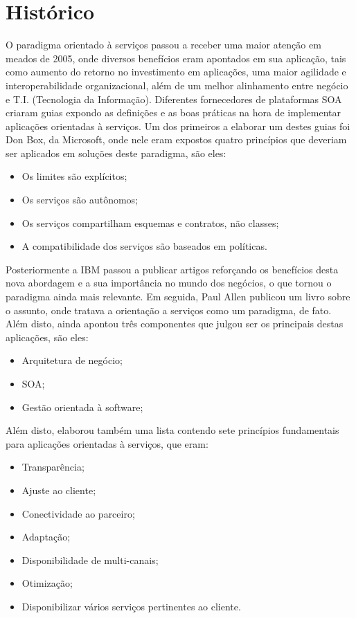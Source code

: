 \documentclass[12pt]{article}
\begin{document}
\section{Histórico}

O paradigma orientado à serviços passou a receber uma maior atenção em meados de 2005, onde diversos benefícios eram apontados em sua aplicação, tais como aumento do retorno no investimento em aplicações, uma maior agilidade e interoperabilidade organizacional, além de um melhor alinhamento entre negócio e T.I. (Tecnologia da Informação).
Diferentes fornecedores de plataformas SOA criaram guias expondo as definições e as boas práticas na hora de implementar aplicações orientadas à serviços. Um dos primeiros a elaborar um destes guias foi Don Box, da Microsoft, onde nele eram expostos quatro princípios que deveriam ser aplicados em soluções deste paradigma, são eles:

\begin{itemize}
	\item Os limites são explícitos;
	\item Os serviços são autônomos;
	\item Os serviços compartilham esquemas e contratos, não classes;
	\item A compatibilidade dos serviços são baseados em políticas.
\end{itemize}

Posteriormente a IBM passou a publicar artigos reforçando os benefícios desta nova abordagem e a sua importância no mundo dos negócios, o que tornou o paradigma ainda mais relevante.
Em seguida, Paul Allen publicou um livro sobre o assunto, onde tratava a orientação a serviços como um paradigma, de fato. Além disto, ainda apontou três componentes que julgou ser os principais destas aplicações, são eles:

\begin{itemize}
	\item Arquitetura de negócio;
	\item SOA;
	\item Gestão orientada à software;
\end{itemize}

Além disto, elaborou também uma lista contendo sete princípios fundamentais para aplicações orientadas à serviços, que eram:

\begin{itemize}
	\item Transparência;
	\item Ajuste ao cliente;
	\item Conectividade ao parceiro;
	\item Adaptação;
	\item Disponibilidade de multi-canais;
	\item Otimização;
	\item Disponibilizar vários serviços pertinentes ao cliente.
\end{itemize}
\end{document}
